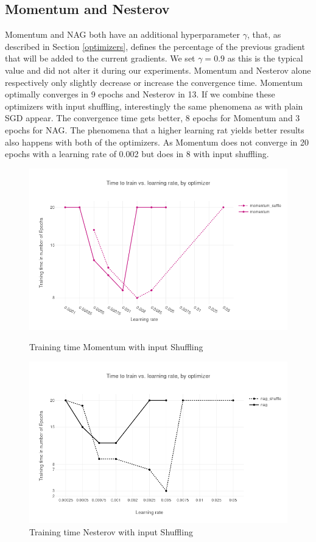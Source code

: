 \subsection{Momentum and Nesterov}
Momentum and NAG \cite{nag} both have an additional hyperparameter $\gamma$, that, as described in Section \ref{optimizers}, defines the percentage of the previous gradient that will be added to the current gradients. We set $\gamma = 0.9$ as this is the typical value and did not alter it during our experiments. Momentum and Nesterov alone respectively only slightly decrease or increase the convergence time. Momentum optimally converges in 9 epochs and Nesterov in 13. If we combine these optimizers with input shuffling, interestingly the same phenomena as with plain SGD appear. The convergence time gets better, 8 epochs for Momentum and 3 epochs for NAG. The phenomena that a higher learning rat yields better results also happens with both of the optimizers. As Momentum does not converge in 20 epochs with a learning rate of 0.002 but does in 8 with input shuffling.
\begin{figure}[h]
\centering
\begin{minipage}{.5\textwidth}
\centering
\includegraphics[scale=0.3]{images/results_mom_shuffle}
\caption{Training time Momentum with input Shuffling}
\label{fig:results_mom}
\label{fig:test1}
\end{minipage}%
\begin{minipage}{.5\textwidth}
\centering
\includegraphics[scale=0.3]{images/results_nag_shuffle}
\caption{Training time Nesterov with input Shuffling}
\label{fig:results_nag}
\end{minipage}
\end{figure}
